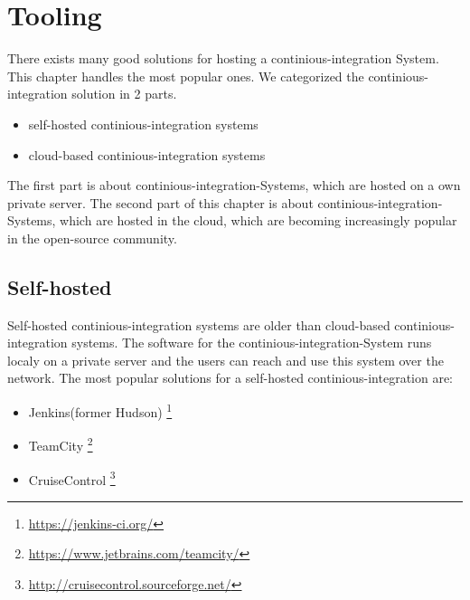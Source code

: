 \section{Tooling}\label{sec:tooling}

There exists many good solutions for hosting a continious-integration System. 
This chapter handles the most popular ones.
We categorized the continious-integration solution in 2 parts. 
\begin{itemize} 
    \item self-hosted continious-integration systems
    \item cloud-based continious-integration systems 
\end{itemize}

The first part is about continious-integration-Systems, which are hosted on a own private server. 
The second part of this chapter is about continious-integration-Systems, which are hosted in the cloud, which are becoming increasingly popular in the open-source community.

\subsection{Self-hosted}\label{sec:tooling-self-hosted}

Self-hosted continious-integration systems are older than cloud-based continious-integration systems.
The software for the continious-integration-System runs localy on a private server 
and the users can reach and use this system over the network. 
The most popular solutions for a self-hosted continious-integration are:
\begin{itemize} 
    \item Jenkins(former Hudson) \footnote{\url{https://jenkins-ci.org/}}
    \item TeamCity \footnote{\url{https://www.jetbrains.com/teamcity/}}
    \item CruiseControl \footnote{\url{http://cruisecontrol.sourceforge.net/}}
\end{itemize}

